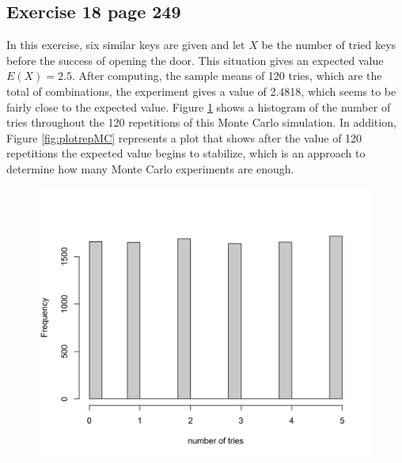 \documentclass[10pt,leter,openany]{article}
\begin{document}
\subsection{Exercise 18 page 249}

In this exercise, six similar keys are given and let $ X $ be the number of tried keys before the success of opening the door. This situation gives an expected value $ E(X) = 2.5 $.  After computing, the sample means of 120 tries, which are the total of combinations, the experiment gives a value of 2.4818, which seems to be fairly close to the expected value. Figure \ref{fig:hist1} shows a histogram of the number of tries throughout the 120 repetitions of this Monte Carlo simulation. In addition, Figure \ref{fig:plotrepMC} represents a plot that shows after the value of 120 repetitions the expected value begins to stabilize, which is an approach to determine how many Monte Carlo experiments are enough.

\begin{figure}
	\begin{center}
		\includegraphics[scale=0.15]{img/hist_18_249}
		\label{fig:hist1}
	\end{center}
\end{figure}
\end{document}
